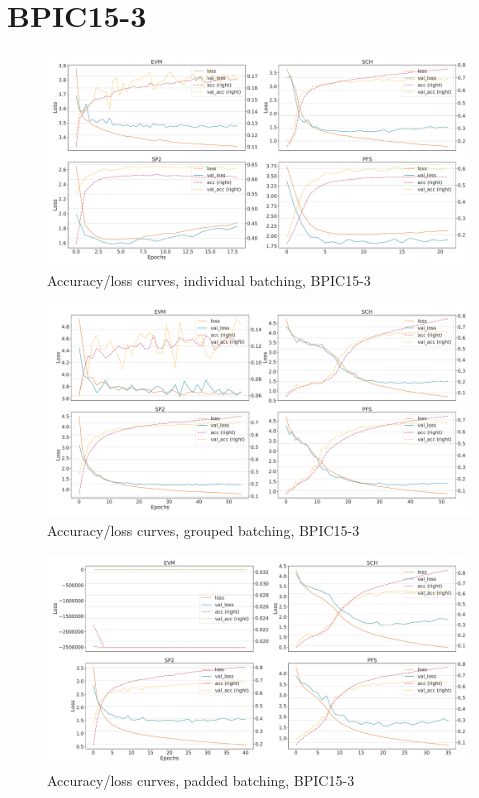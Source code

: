 \section*{BPIC15-3}
\begin{figure}[!htb]
    \centering
    \includegraphics[width=\textwidth]{gfx/bpic2015_3/individual_loss_acc_curve.pdf}
    \caption{Accuracy/loss curves, individual batching, BPIC15-3}
\end{figure}
\begin{figure}[!htb]
    \centering
    \includegraphics[width=\textwidth]{gfx/bpic2015_3/grouped_loss_acc_curve.pdf}
    \caption{Accuracy/loss curves, grouped batching, BPIC15-3}
\end{figure}
\begin{figure}[!htb]
    \centering
    \includegraphics[width=\textwidth]{gfx/bpic2015_3/padded_loss_acc_curve.pdf}
    \caption{Accuracy/loss curves, padded batching, BPIC15-3}
\end{figure}
